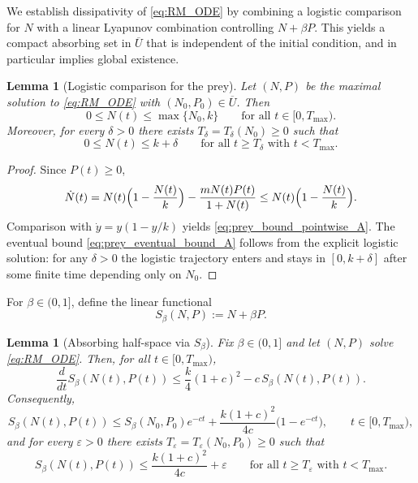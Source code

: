 \documentclass[pdflatex,sn-mathphys-ay]{sn-jnl}
\theoremstyle{thmstyleone}
\newtheorem{lemma}[theorem]{Lemma}
\theoremstyle{definition}
\theoremstyle{remark}
\begin{document}
We establish dissipativity of \eqref{eq:RM_ODE} by combining a logistic comparison for $N$ with a linear Lyapunov
combination controlling $N+\beta P$. This yields a compact absorbing set in $\overline U$ that is independent of the
initial condition, and in particular implies global existence.

\begin{lemma}[Logistic comparison for the prey]\label{lem:prey_logistic_bound_A}
Let $(N,P)$ be the maximal solution to \eqref{eq:RM_ODE} with $(N_0,P_0)\in\overline U$. Then
\begin{equation}\label{eq:prey_bound_pointwise_A}
0\le N(t)\le \max\{N_0,k\}\qquad \text{for all }t\in[0,T_{\max}).
\end{equation}
Moreover, for every $\delta>0$ there exists $T_\delta=T_\delta(N_0)\ge 0$ such that
\begin{equation}\label{eq:prey_eventual_bound_A}
0\le N(t)\le k+\delta\qquad \text{for all }t\ge T_\delta \text{ with }t<T_{\max}.
\end{equation}
\end{lemma}

\begin{proof}
Since $P(t)\ge 0$,
\[
\dot N(t)=N(t)\Bigl(1-\frac{N(t)}{k}\Bigr)-\frac{mN(t)P(t)}{1+N(t)}
\le N(t)\Bigl(1-\frac{N(t)}{k}\Bigr).
\]
Comparison with $\dot y=y(1-y/k)$ yields \eqref{eq:prey_bound_pointwise_A}. The eventual bound
\eqref{eq:prey_eventual_bound_A} follows from the explicit logistic solution: for any $\delta>0$ the logistic
trajectory enters and stays in $[0,k+\delta]$ after some finite time depending only on $N_0$.
\end{proof}

For $\beta\in(0,1]$, define the linear functional
\begin{equation}\label{eq:Sbeta_def_A}
S_\beta(N,P):=N+\beta P.
\end{equation}

\begin{lemma}[Absorbing half-space via $S_\beta$]\label{lem:absorbing_halfspace_A}
Fix $\beta\in(0,1]$ and let $(N,P)$ solve \eqref{eq:RM_ODE}. Then, for all $t\in[0,T_{\max})$,
\begin{equation}\label{eq:Sbeta_diff_ineq_A}
\frac{d}{dt}S_\beta(N(t),P(t))
\le \frac{k}{4}(1+c)^2 - c\,S_\beta(N(t),P(t)).
\end{equation}
Consequently,
\begin{equation}\label{eq:Sbeta_bound_A}
S_\beta(N(t),P(t))
\le S_\beta(N_0,P_0)e^{-ct}+\frac{k(1+c)^2}{4c}\bigl(1-e^{-ct}\bigr),
\qquad t\in[0,T_{\max}),
\end{equation}
and for every $\varepsilon>0$ there exists $T_\varepsilon=T_\varepsilon(N_0,P_0)\ge 0$ such that
\begin{equation}\label{eq:Sbeta_absorption_A}
S_\beta(N(t),P(t))\le \frac{k(1+c)^2}{4c}+\varepsilon
\qquad \text{for all }t\ge T_\varepsilon \text{ with }t<T_{\max}.
\end{equation}
\end{lemma}
\end{document}
